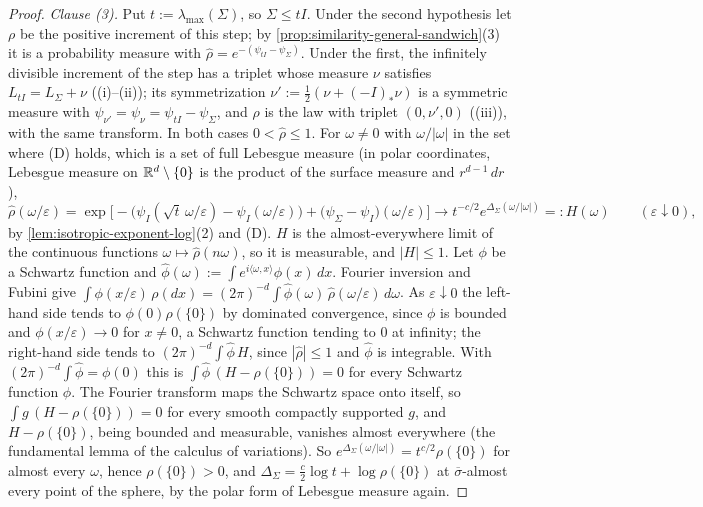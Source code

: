 \begin{proof}
\emph{Clause (3).} Put $t := \lambda_{\max}(\Sigma)$, so $\Sigma \le tI$. Under the second hypothesis let $\rho$ be the
positive increment of this step; by \ref{prop:similarity-general-sandwich}(3) it is a probability measure
with $\widehat\rho = e^{-(\psi_{tI} - \psi_\Sigma)}$.
Under the first, the infinitely divisible increment of the step has a triplet whose \Levy{} measure $\nu$
satisfies $L_{tI} = L_\Sigma + \nu$ ((i)--(ii)); its symmetrization $\nu' := \tfrac12(\nu + (-I)_*\nu)$ is a
symmetric \Levy{} measure with $\psi_{\nu'} = \psi_\nu = \psi_{tI} - \psi_\Sigma$, and $\rho$ is the law with
triplet $(0, \nu', 0)$ ((iii)), with the same transform. In both cases $0 < \widehat\rho \le 1$. For
$\omega \ne 0$ with $\omega/|\omega|$ in the set where (D) holds, which is a set of full Lebesgue measure (in polar
coordinates, Lebesgue measure on $\mathbb{R}^d \setminus \{0\}$ is the product of the surface measure and $r^{d-1}\,dr$),
\[
  \widehat\rho(\omega/\varepsilon) = \exp\bigl[-\bigl(\psi_I(\sqrt t\,\omega/\varepsilon) - \psi_I(\omega/\varepsilon)\bigr)
  + \bigl(\psi_\Sigma - \psi_I\bigr)(\omega/\varepsilon)\bigr]
  \to t^{-c/2}e^{\Delta_\Sigma(\omega/|\omega|)} =: H(\omega)
  \qquad (\varepsilon \downarrow 0),
\]
by \ref{lem:isotropic-exponent-log}(2) and (D). $H$ is the almost-everywhere limit of the continuous
functions $\omega \mapsto \widehat\rho(n\omega)$, so it is measurable, and $|H| \le 1$. Let $\phi$ be a Schwartz
function and $\widehat\phi(\omega) := \int e^{i\langle\omega,x\rangle}\phi(x)\,dx$. Fourier inversion and Fubini give
$\int\phi(x/\varepsilon)\,\rho(dx) = (2\pi)^{-d}\int\widehat\phi(\omega)\,\widehat\rho(\omega/\varepsilon)\,d\omega$. As
$\varepsilon \downarrow 0$ the left-hand side tends to $\phi(0)\rho(\{0\})$ by dominated convergence, since $\phi$ is
bounded and $\phi(x/\varepsilon) \to 0$ for $x \ne 0$, a Schwartz function tending to $0$ at infinity; the
right-hand side tends to $(2\pi)^{-d}\int\widehat\phi\,H$, since $|\widehat\rho| \le 1$ and $\widehat\phi$ is integrable.
With $(2\pi)^{-d}\int\widehat\phi = \phi(0)$ this is $\int\widehat\phi\,(H - \rho(\{0\})) = 0$ for every Schwartz
function $\phi$. The Fourier transform maps the Schwartz space onto itself, so $\int g\,(H - \rho(\{0\})) = 0$
for every smooth compactly supported $g$, and $H - \rho(\{0\})$, being bounded and measurable, vanishes almost
everywhere (the fundamental lemma of the calculus of variations). So $e^{\Delta_\Sigma(\omega/|\omega|)} =
t^{c/2}\rho(\{0\})$ for almost every $\omega$, hence $\rho(\{0\}) > 0$, and $\Delta_\Sigma = \tfrac c2\log t + \log\rho(\{0\})$
at $\overline\sigma$-almost every point of the sphere, by the polar form of Lebesgue measure again.
\end{proof}

